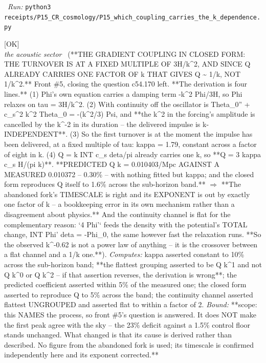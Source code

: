 \begin{description}
\ \emph{Run:} \texttt{python3 receipts/P15\_CR\_cosmology/P15\_which\_coupling\_carries\_the\_k\_dependence.py}
\item[\rcptlabel{P15_the_gradient_coupling_in_closed_form}{P15R66}\textbf{P15R66}\quad\texttt{P15\_the\_gradient\_coupling\_in\_closed\_form}]\hfill\textsf{[OK]}\\
\textit{the acoustic sector} \ (**THE GRADIENT COUPLING IN CLOSED FORM: THE TURNOVER IS AT A FIXED MULTIPLE OF 3H/k\textasciicircum{}2, AND SINCE Q ALREADY CARRIES ONE FACTOR OF k THAT GIVES Q \textasciitilde{} 1/k, NOT 1/k\textasciicircum{}2.** Front \#5, closing the question c54.170 left. **The derivation is four lines.** (1) Phi's own equation carries a damping term -k\textasciicircum{}2 Phi/3H, so Phi relaxes on tau = 3H/k\textasciicircum{}2. (2) With continuity off the oscillator is Theta\_0'' + c\_s\textasciicircum{}2 k\textasciicircum{}2 Theta\_0 = -(k\textasciicircum{}2/3) Psi, and **the k\textasciicircum{}2 in the forcing's amplitude is cancelled by the k\textasciicircum{}-2 in its duration -- the delivered impulse is k-INDEPENDENT**. (3) So the first turnover is at the moment the impulse has been delivered, at a fixed multiple of tau: kappa = 1.79, constant across a factor of eight in k. (4) Q = k INT c\_s deta/pi already carries one k, so **Q = 3 kappa c\_s H/(pi k)**. **PREDICTED Q k = 0.010403/Mpc AGAINST A MEASURED 0.010372 -- 0.30\% -- with nothing fitted but kappa; and the closed form reproduces Q itself to 1.6\% across the sub-horizon band.** \ensuremath{\Rightarrow} **The abandoned fork's TIMESCALE is right and its EXPONENT is out by exactly one factor of k -- a bookkeeping error in its own mechanism rather than a disagreement about physics.** And the continuity channel is flat for the complementary reason: `4 Phi'` feeds the density with the potential's TOTAL change, INT Phi' deta = -Phi\_0, the same however fast the relaxation runs. **So the observed k\textasciicircum{}-0.62 is not a power law of anything -- it is the crossover between a flat channel and a 1/k one.**). 
\emph{Computes:} kappa asserted constant to 10\% across the sub-horizon band; **the flattest grouping asserted to be Q k\textasciicircum{}1 and not Q k\textasciicircum{}0 or Q k\textasciicircum{}2 -- if that assertion reverses, the derivation is wrong**; the predicted coefficient asserted within 5\% of the measured one; the closed form asserted to reproduce Q to 5\% across the band; the continuity channel asserted flattest UNGROUPED and asserted flat to within a factor of 2.
 \emph{Bound:} **scope: this NAMES the process, so front \#5's question is answered. It does NOT make the first peak agree with the sky -- the 23\% deficit against a 1.5\% control floor stands unchanged. What changed is that its cause is derived rather than described. No figure from the abandoned fork is used; its timescale is confirmed independently here and its exponent corrected.**

\end{description}
